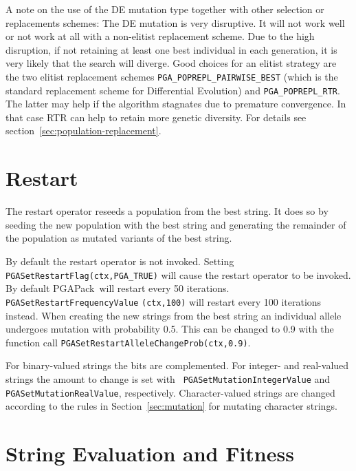 \documentclass{report}
\newcommand{\pga}{PGAPack}
\begin{document}
A note on the use of the DE mutation type together with other selection
or replacements schemes: The DE mutation is very disruptive. It will not
work well or not work at all with a non-elitist replacement scheme. Due
to the high disruption, if not retaining at least one best individual
in each generation, it is very likely that the search will diverge. Good
choices for an elitist strategy are the two elitist replacement schemes
\verb+PGA_POPREPL_PAIRWISE_BEST+ (which is the standard replacement
scheme for Differential Evolution) and \verb+PGA_POPREPL_RTR+. The
latter may help if the algorithm stagnates due to premature convergence.
In that case RTR can help to retain more genetic diversity. For details
see section~\ref{sec:population-replacement}.


\section{Restart}\label{sec:restart}

The restart operator reseeds a population from the best string.  It does so by
seeding the new population with the best string and generating the remainder
of the population as mutated variants of the best string.

\begin{sloppypar}
By default the restart operator is not invoked.  Setting {\tt
PGASetRestartFlag(ctx,PGA\_TRUE)} will cause the restart operator to be
invoked.  By default \pga\ will restart every 50 iterations.  {\tt
PGASetRestartFrequencyValue} {\tt (ctx,100)} will restart every 100 iterations
instead.  When creating the new strings from the best string an individual
allele undergoes mutation with probability 0.5.  This can be changed to 0.9
with the function call {\tt PGASetRestartAlleleChangeProb(ctx,0.9)}.
\end{sloppypar}

For binary-valued strings the bits are complemented.  For integer- and
real-valued strings the amount to change is set with {\tt
PGASetMutationIntegerValue} and {\tt PGASetMutationRealValue}, respectively.
Character-valued strings are changed according to the rules in
Section~\ref{sec:mutation} for mutating character strings.

\section{String Evaluation and Fitness}\label{sec:evaluation}
\end{document}
